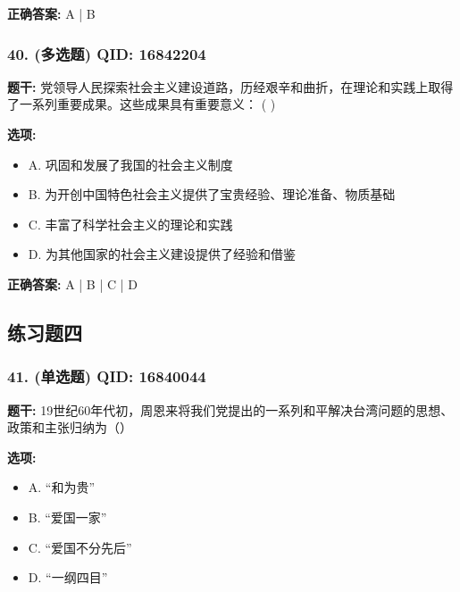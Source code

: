 \documentclass[12pt,UTF8]{ctexart}
\begin{document}
\textbf{正确答案:}
A | B

\vspace{0.3em}\hrulefill\vspace{0.7em}

\subsubsection*{40. (多选题) \small QID: 16842204}

\textbf{题干:}
党领导人民探索社会主义建设道路，历经艰辛和曲折，在理论和实践上取得了一系列重要成果。这些成果具有重要意义： ( )

\textbf{选项:}
\begin{itemize}[leftmargin=*]

  \item A. 巩固和发展了我国的社会主义制度

  \item B. 为开创中国特色社会主义提供了宝贵经验、理论准备、物质基础

  \item C. 丰富了科学社会主义的理论和实践

  \item D. 为其他国家的社会主义建设提供了经验和借鉴

\end{itemize}

\textbf{正确答案:}
A | B | C | D

\vspace{0.3em}\hrulefill\vspace{0.7em}

\subsection*{练习题四}

\subsubsection*{41. (单选题) \small QID: 16840044}

\textbf{题干:}
19世纪60年代初，周恩来将我们党提出的一系列和平解决台湾问题的思想、政策和主张归纳为（）

\textbf{选项:}
\begin{itemize}[leftmargin=*]

  \item A. “和为贵”

  \item B. “爱国一家”

  \item C. “爱国不分先后”

  \item D. “一纲四目”

\end{itemize}
\end{document}
